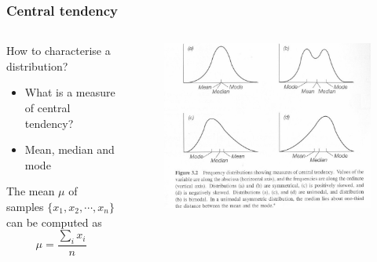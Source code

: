 \documentclass[10pt, compress]{beamer}
\begin{document}
\begin{frame}
    \frametitle{Central tendency}
    \begin{columns}
        \begin{block}{How to characterise a distribution?}
            \begin{itemize}
                \item \alert{What is a measure of central tendency?}
                \item Mean, median and mode
            \end{itemize}
            \smallskip
            The mean $\mu$ of samples $\{x_1,x_2,\cdots,x_n\}$ can be computed
            as
            \begin{equation}
                \mu = \frac{\sum_i x_i}{n}
            \end{equation}
        \end{block}
        \begin{block}{}
            \begin{figure}
                \begin{center}
                    \includegraphics[scale=0.5]{img/central_tendancy.jpg}
                \end{center}
            \end{figure}
        \end{block}
    \end{columns}
\end{frame}
\end{document}
